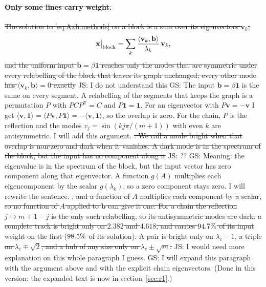\documentclass[11pt,a4paper]{article}
\newcommand{\js}[1]{{\color{blue} JS: #1 }}
\newcommand{\gs}[1]{{\color{orange!85!black} GS: #1 }}
\newcommand{\gsx}[1]{{\color{gray}\sout{#1}}}
\newenvironment{gsxblock}{\color{gray}}{}
\begin{document}
\paragraph{\gsx{Only some lines carry weight.}}
\gsx{The solution to \mbox{\eqref{eq:Axb:methods}} on a block is a sum over its eigenvectors $\mathbf{v}_k$,}
\begin{gsxblock}
\begin{equation*}
\mathbf{x}\big|_{\rm block}=\sum_k\frac{\langle\mathbf{v}_k,\mathbf{b}\rangle}{\lambda_k}\,\mathbf{v}_k ,
\end{equation*}
\end{gsxblock}
\gsx{and the uniform input $\mathbf{b}=\beta\mathbf{1}$ reaches only the modes that are symmetric under
every relabelling of the block that leaves its graph unchanged; every other mode has
$\langle\mathbf{v}_k,\mathbf{b}\rangle=0$ exactly} \js{I do not understand this} \gs{The input $\mathbf{b}=\beta\mathbf{1}$ is the same on every segment. A relabelling of the segments that keeps the graph is a permutation $P$ with $PCP^{\mathsf T}=C$ and $P\mathbf{1}=\mathbf{1}$. For an eigenvector with $P\mathbf{v}=-\mathbf{v}$ I get $\langle\mathbf{v},\mathbf{1}\rangle=\langle P\mathbf{v},P\mathbf{1}\rangle=-\langle\mathbf{v},\mathbf{1}\rangle$, so the overlap is zero. For the chain, $P$ is the reflection and the modes $v_j=\sin(kj\pi/(m+1))$ with even $k$ are antisymmetric. I will add this argument.} \gsx{. We call a mode bright when that overlap is non-zero and
dark when it vanishes. A dark mode is in the spectrum of the block, but the input has no component along it} \js{??} \gs{Meaning: the eigenvalue is in the spectrum of the block, but the input vector has zero component along that eigenvector. A function $g(A)$ multiplies each eigencomponent by the scalar $g(\lambda_k)$, so a zero component stays zero. I will rewrite the sentence.  } \gsx{, and a function of $A$ multiplies each component by a scalar, so no function of $A$ applied to
$\mathbf{b}$ can give it one. For a chain the reflection $j\mapsto m+1-j$ is the only such
relabelling, so its antisymmetric modes are dark: a complete track is bright only on $2.382$ and
$4.618$, and carries $94.7\%$ of its input weight on the first
($98.5\%$ of its solution). A pair is bright only on $\lambda_c-1$, a triple on
$\lambda_c\mp\sqrt2$, and a hub of any size only on $\lambda_c\pm\sqrt m$.} \js{I would need more explanation on this whole paragraph I guess.} \gs{I will expand this paragraph with the argument above and with the explicit chain eigenvectors. (Done in this version: the expanded text is now in section~\mbox{\ref{sec:r1}}.)}
\end{document}
